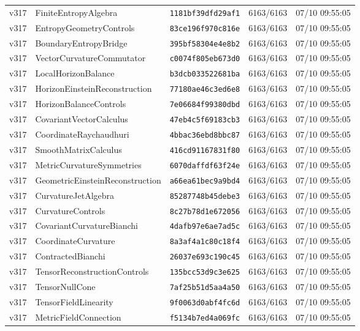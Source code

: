 \documentclass[11pt]{article}
\theoremstyle{definition}\newtheorem{deriv}{Derivação}
\begin{document}
{\begin{longtable}{@{}lllll@{}}
v317 & FiniteEntropyAlgebra & \texttt{1181bf39dfd29af1} & 6163/6163 & 07/10 09:55:05 \\
v317 & EntropyGeometryControls & \texttt{83ce196f970c816e} & 6163/6163 & 07/10 09:55:05 \\
v317 & BoundaryEntropyBridge & \texttt{395bf58304e4e8b2} & 6163/6163 & 07/10 09:55:05 \\
v317 & VectorCurvatureCommutator & \texttt{c0074f805eb673d0} & 6163/6163 & 07/10 09:55:05 \\
v317 & LocalHorizonBalance & \texttt{b3dcb033522681ba} & 6163/6163 & 07/10 09:55:05 \\
v317 & HorizonEinsteinReconstruction & \texttt{77180ae46c3ed6e8} & 6163/6163 & 07/10 09:55:05 \\
v317 & HorizonBalanceControls & \texttt{7e06684f99380dbd} & 6163/6163 & 07/10 09:55:05 \\
v317 & CovariantVectorCalculus & \texttt{47eb4c5f69183cb3} & 6163/6163 & 07/10 09:55:05 \\
v317 & CoordinateRaychaudhuri & \texttt{4bbac36ebd8bbc87} & 6163/6163 & 07/10 09:55:05 \\
v317 & SmoothMatrixCalculus & \texttt{416cd91167831f80} & 6163/6163 & 07/10 09:55:05 \\
v317 & MetricCurvatureSymmetries & \texttt{6070daffdf63f24e} & 6163/6163 & 07/10 09:55:05 \\
v317 & GeometricEinsteinReconstruction & \texttt{a66ea61bec9a9bd4} & 6163/6163 & 07/10 09:55:05 \\
v317 & CurvatureJetAlgebra & \texttt{85287748b45debe3} & 6163/6163 & 07/10 09:55:05 \\
v317 & CurvatureControls & \texttt{8c27b78d1e672056} & 6163/6163 & 07/10 09:55:05 \\
v317 & CovariantCurvatureBianchi & \texttt{4dafb97e6ae7ad5c} & 6163/6163 & 07/10 09:55:05 \\
v317 & CoordinateCurvature & \texttt{8a3af4a1c80c18f4} & 6163/6163 & 07/10 09:55:05 \\
v317 & ContractedBianchi & \texttt{26037e693c190c45} & 6163/6163 & 07/10 09:55:05 \\
v317 & TensorReconstructionControls & \texttt{135bcc53d9c3e625} & 6163/6163 & 07/10 09:55:05 \\
v317 & TensorNullCone & \texttt{7af25b51d5aa4a50} & 6163/6163 & 07/10 09:55:05 \\
v317 & TensorFieldLinearity & \texttt{9f0063d0abf4fc6d} & 6163/6163 & 07/10 09:55:05 \\
v317 & MetricFieldConnection & \texttt{f5134b7ed4a069fc} & 6163/6163 & 07/10 09:55:05 \\

\end{longtable}}
\end{document}
